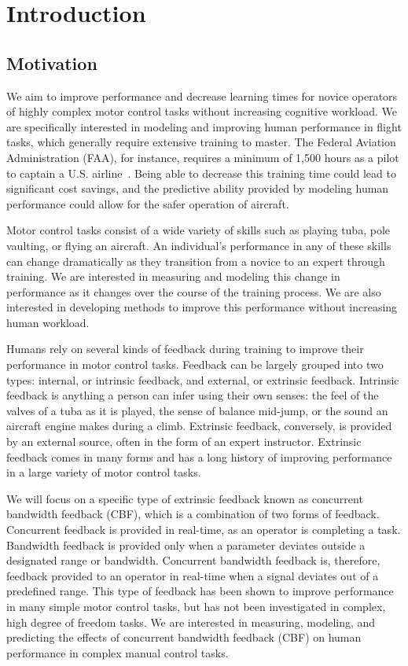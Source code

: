 \chapter{Introduction}

\section{Motivation}
\label{sec:intro_overview}
We aim to improve performance and decrease learning times for novice operators of highly complex motor control tasks without increasing cognitive workload.
We are specifically interested in modeling and improving human performance in flight tasks, which generally require extensive training to master.
The Federal Aviation Administration (FAA), for instance, requires a minimum of 1,500 hours as a pilot to captain a U.S. airline~\citep{FAA}.
Being able to decrease this training time could lead to significant cost savings, and the predictive ability provided by modeling human performance could allow for the safer operation of aircraft.

Motor control tasks consist of a wide variety of skills such as playing tuba, pole vaulting, or flying an aircraft.
An individual's performance in any of these skills can change dramatically as they transition from a novice to an expert through training.
We are interested in measuring and modeling this change in performance as it changes over the course of the training process.
We are also interested in developing methods to improve this performance without increasing human workload.

Humans rely on several kinds of feedback during training to improve their performance in motor control tasks.
Feedback can be largely grouped into two types: internal, or intrinsic feedback, and external, or extrinsic feedback.
Intrinsic feedback is anything a person can infer using their own senses: the feel of the valves of a tuba as it is played, the sense of balance mid-jump, or the sound an aircraft engine makes during a climb.
Extrinsic feedback, conversely, is provided by an external source, often in the form of an expert instructor.
Extrinsic feedback comes in many forms and has a long history of improving performance in a large variety of motor control tasks.

We will focus on a specific type of extrinsic feedback known as concurrent bandwidth feedback (CBF), which is a combination of two forms of feedback.
Concurrent feedback is provided in real-time, as an operator is completing a task.
Bandwidth feedback is provided only when a parameter deviates outside a designated range or bandwidth.
Concurrent bandwidth feedback is, therefore, feedback provided to an operator in real-time when a signal deviates out of a predefined range.
This type of feedback has been shown to improve performance in many simple motor control tasks, but has not been investigated in complex, high degree of freedom tasks.
We are interested in measuring, modeling, and predicting the effects of concurrent bandwidth feedback (CBF) on human performance in complex manual control tasks.

